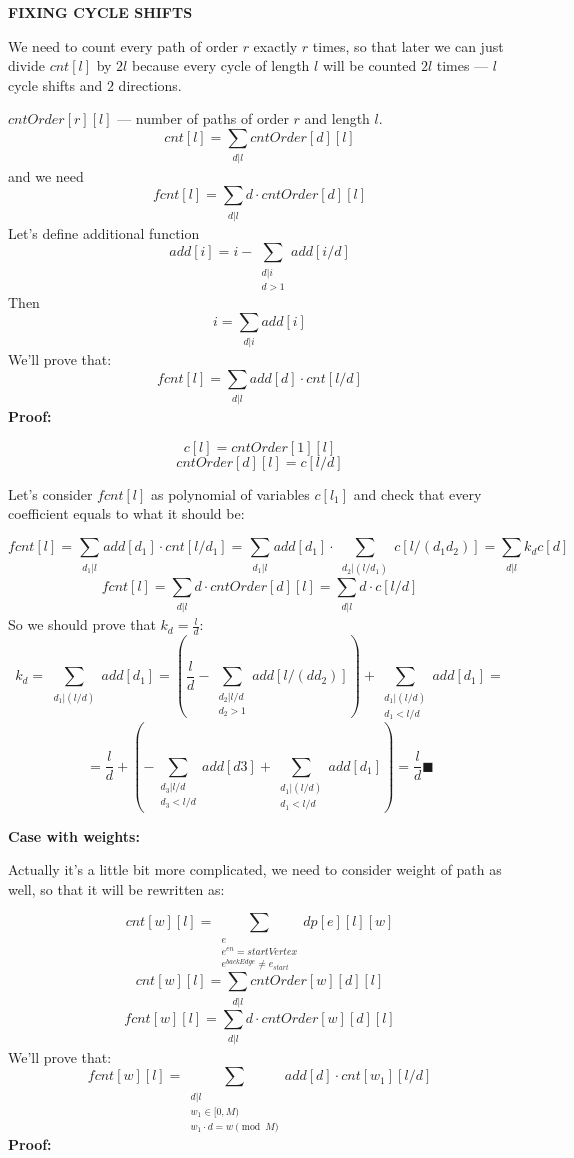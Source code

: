\documentclass{article}
\begin{document}
\textbf{FIXING CYCLE SHIFTS}

We need to count every path of order $r$ exactly $r$ times, so that later we can just divide $cnt[l]$ by $2l$ because every cycle of length $l$ will be counted $2l$ times --- $l$ cycle shifts and $2$ directions.

$cntOrder[r][l]$ --- number of paths of order $r$ and length $l$.
\[
cnt[l] = \sum_{\substack{d | l}} cntOrder[d][l]
\]
and we need
\[
fcnt[l] = \sum_{\substack{d | l}} d \cdot cntOrder[d][l]
\]
Let's define additional function
\[
add[i] = i - \sum_{\substack{d | i \\ d > 1}} add[i / d]  
\]
Then
\[
i = \sum_{\substack{d | i}} add[i]
\]
We'll prove that:
\[
fcnt[l] = \sum_{\substack{d | l}} add[d] \cdot cnt[l / d]
\]
\textbf{Proof:}

\[
c[l] = cntOrder[1][l]
\]
\[
cntOrder[d][l] = c[l / d]
\]

Let's consider $fcnt[l]$ as polynomial of variables $c[l_1]$ and check that every
coefficient equals to what it should be:

\[
fcnt[l] = \sum_{\substack{d_1 | l}} add[d_1] \cdot cnt[l / d_1] = \sum_{\substack{d_1 | l}} add[d_1] \cdot \sum_{\substack{d_2 | (l/d_1)}} c[l/(d_1 d_2)] = \sum_{\substack{d | l}} k_d c[d]
\]
\[
fcnt[l] = \sum_{\substack{d | l}} d \cdot cntOrder[d][l] = \sum_{\substack{d | l}} d \cdot c[l / d]
\]
So we should prove that $k_d = \frac{l}{d}$:
\[
k_d = \sum_{\substack{d_1 | (l/d)}} add[d_1]  = (\frac{l}{d} - \sum_{\substack{d_2 | l/d \\ d_2 > 1}} add[l / (d d_2)])  + \sum_{\substack{d_1 | (l/d) \\ d_1 < l/d}} add[d_1] =
\]
\[
=\frac{l}{d} + (-\sum_{\substack{d_3 | l/d \\ d_3 < l/d}} add[d3]  + \sum_{\substack{d_1 | (l/d) \\ d_1 < l/d}} add[d_1]) = \frac{l}{d} \blacksquare
\]

\textbf{Case with weights:}

Actually it's a little bit more complicated, we need to consider weight of path as well, so that
it will be rewritten as:

\[
cnt[w][l] = \sum_{\substack{e \\ e^{en} = startVertex \\ e^{backEdge} \neq e_{start}}} dp[e][l][w]
\]
\[
cnt[w][l] = \sum_{\substack{d | l}} cntOrder[w][d][l]
\]
\[
fcnt[w][l] = \sum_{\substack{d | l}} d \cdot cntOrder[w][d][l]
\]
We'll prove that:
\[
fcnt[w][l] = \sum_{\substack{d | l \\ w_1 \in [0, M) \\ w_1 \cdot d = w \pmod {M}}} add[d] \cdot cnt[w_1][l / d]
\]
\textbf{Proof:}
\end{document}
